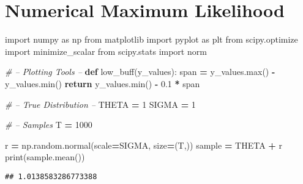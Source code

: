 \documentclass[]{article}
\newenvironment{Shaded}{\begin{snugshade}}{\end{snugshade}}
\newcommand{\BuiltInTok}[1]{#1}
\newcommand{\CommentTok}[1]{\textcolor[rgb]{0.56,0.35,0.01}{\textit{#1}}}
\newcommand{\ControlFlowTok}[1]{\textcolor[rgb]{0.13,0.29,0.53}{\textbf{#1}}}
\newcommand{\DecValTok}[1]{\textcolor[rgb]{0.00,0.00,0.81}{#1}}
\newcommand{\FloatTok}[1]{\textcolor[rgb]{0.00,0.00,0.81}{#1}}
\newcommand{\ImportTok}[1]{#1}
\newcommand{\KeywordTok}[1]{\textcolor[rgb]{0.13,0.29,0.53}{\textbf{#1}}}
\newcommand{\NormalTok}[1]{#1}
\newcommand{\OperatorTok}[1]{\textcolor[rgb]{0.81,0.36,0.00}{\textbf{#1}}}
\begin{document}
\hypertarget{numerical-maximum-likelihood}{%
\section{Numerical Maximum
Likelihood}\label{numerical-maximum-likelihood}}

\begin{Shaded}
\begin{Highlighting}[]
\ImportTok{import}\NormalTok{ numpy }\ImportTok{as}\NormalTok{ np}
\ImportTok{from}\NormalTok{ matplotlib }\ImportTok{import}\NormalTok{ pyplot }\ImportTok{as}\NormalTok{ plt}
\ImportTok{from}\NormalTok{ scipy.optimize }\ImportTok{import}\NormalTok{ minimize_scalar}
\ImportTok{from}\NormalTok{ scipy.stats }\ImportTok{import}\NormalTok{ norm}


\CommentTok{# -- Plotting Tools --}
\KeywordTok{def}\NormalTok{ low_buff(y_values):}
\NormalTok{    span }\OperatorTok{=}\NormalTok{ y_values.}\BuiltInTok{max}\NormalTok{() }\OperatorTok{-}\NormalTok{ y_values.}\BuiltInTok{min}\NormalTok{()}
    \ControlFlowTok{return}\NormalTok{ y_values.}\BuiltInTok{min}\NormalTok{() }\OperatorTok{-} \FloatTok{0.1} \OperatorTok{*}\NormalTok{ span}


\CommentTok{# -- True Distribution --}
\NormalTok{THETA }\OperatorTok{=} \DecValTok{1}
\NormalTok{SIGMA }\OperatorTok{=} \DecValTok{1}

\CommentTok{# -- Samples}
\NormalTok{T }\OperatorTok{=} \DecValTok{1000}

\NormalTok{r }\OperatorTok{=}\NormalTok{ np.random.normal(scale}\OperatorTok{=}\NormalTok{SIGMA, size}\OperatorTok{=}\NormalTok{(T,))}
\NormalTok{sample }\OperatorTok{=}\NormalTok{ THETA }\OperatorTok{+}\NormalTok{ r}
\BuiltInTok{print}\NormalTok{(sample.mean())}
\end{Highlighting}
\end{Shaded}

\begin{verbatim}
## 1.0138583286773388
\end{verbatim}
\end{document}
